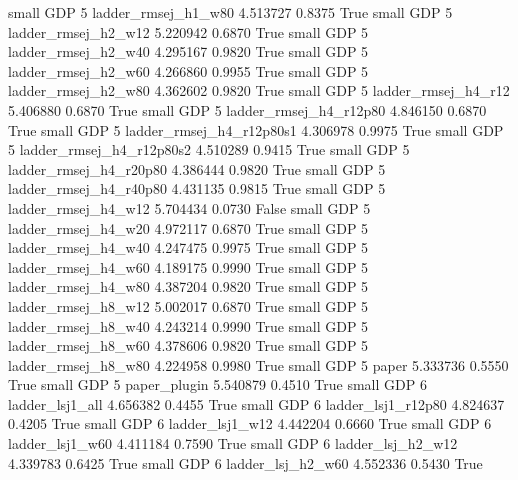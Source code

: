      small      GDP                 5      ladder_rmsej_h1_w80   4.513727      0.8375    True
     small      GDP                 5      ladder_rmsej_h2_w12   5.220942      0.6870    True
     small      GDP                 5      ladder_rmsej_h2_w40   4.295167      0.9820    True
     small      GDP                 5      ladder_rmsej_h2_w60   4.266860      0.9955    True
     small      GDP                 5      ladder_rmsej_h2_w80   4.362602      0.9820    True
     small      GDP                 5      ladder_rmsej_h4_r12   5.406880      0.6870    True
     small      GDP                 5   ladder_rmsej_h4_r12p80   4.846150      0.6870    True
     small      GDP                 5 ladder_rmsej_h4_r12p80s1   4.306978      0.9975    True
     small      GDP                 5 ladder_rmsej_h4_r12p80s2   4.510289      0.9415    True
     small      GDP                 5   ladder_rmsej_h4_r20p80   4.386444      0.9820    True
     small      GDP                 5   ladder_rmsej_h4_r40p80   4.431135      0.9815    True
     small      GDP                 5      ladder_rmsej_h4_w12   5.704434      0.0730   False
     small      GDP                 5      ladder_rmsej_h4_w20   4.972117      0.6870    True
     small      GDP                 5      ladder_rmsej_h4_w40   4.247475      0.9975    True
     small      GDP                 5      ladder_rmsej_h4_w60   4.189175      0.9990    True
     small      GDP                 5      ladder_rmsej_h4_w80   4.387204      0.9820    True
     small      GDP                 5      ladder_rmsej_h8_w12   5.002017      0.6870    True
     small      GDP                 5      ladder_rmsej_h8_w40   4.243214      0.9990    True
     small      GDP                 5      ladder_rmsej_h8_w60   4.378606      0.9820    True
     small      GDP                 5      ladder_rmsej_h8_w80   4.224958      0.9980    True
     small      GDP                 5                    paper   5.333736      0.5550    True
     small      GDP                 5             paper_plugin   5.540879      0.4510    True
     small      GDP                 6          ladder_lsj1_all   4.656382      0.4455    True
     small      GDP                 6       ladder_lsj1_r12p80   4.824637      0.4205    True
     small      GDP                 6          ladder_lsj1_w12   4.442204      0.6660    True
     small      GDP                 6          ladder_lsj1_w60   4.411184      0.7590    True
     small      GDP                 6        ladder_lsj_h2_w12   4.339783      0.6425    True
     small      GDP                 6        ladder_lsj_h2_w60   4.552336      0.5430    True

